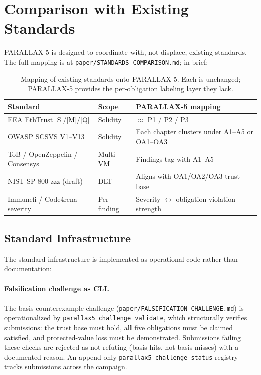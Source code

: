 \documentclass[11pt,a4paper]{article}
\begin{document}
\section{Comparison with Existing Standards}\label{sec:standards}

PARALLAX-5 is designed to coordinate with, not displace, existing standards. The full mapping is at \texttt{paper/STANDARDS\_COMPARISON.md}; in brief:

\begin{table}[h]
\centering
\small
\begin{tabular}{lll}
\toprule
Standard & Scope & PARALLAX-5 mapping \\
\midrule
EEA EthTrust [S]/[M]/[Q] & Solidity & $\approx$ P1 / P2 / P3 \\
OWASP SCSVS V1--V13 & Solidity & Each chapter clusters under A1--A5 or OA1--OA3 \\
ToB / OpenZeppelin / Consensys & Multi-VM & Findings tag with A1--A5 \\
NIST SP 800-zzz (draft) & DLT & Aligns with OA1/OA2/OA3 trust-base \\
Immunefi / Code4rena severity & Per-finding & Severity $\leftrightarrow$ obligation violation strength \\
\bottomrule
\end{tabular}
\caption{Mapping of existing standards onto PARALLAX-5. Each is unchanged; PARALLAX-5 provides the per-obligation labeling layer they lack.}\label{tab:standards}
\end{table}



\subsection{Standard Infrastructure}\label{sec:ops}

The standard infrastructure is implemented as operational code rather than documentation:

\paragraph{Falsification challenge as CLI.}
The basis counterexample challenge (\texttt{paper/FALSIFICATION\_\allowbreak CHALLENGE.md}) is operationalized by \texttt{parallax5 challenge validate}, which structurally verifies submissions: the trust base must hold, all five obligations must be claimed satisfied, and protected-value loss must be demonstrated. Submissions failing these checks are rejected as not-refuting (basis hits, not basis misses) with a documented reason. An append-only \texttt{parallax5 challenge status} registry tracks submissions across the campaign.
\end{document}
